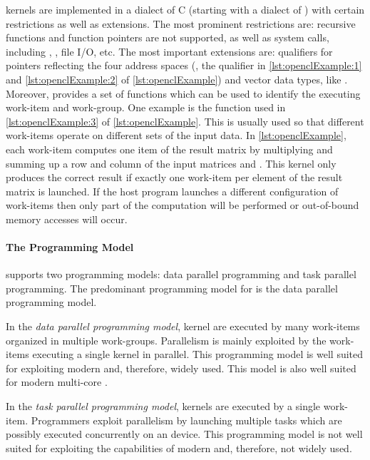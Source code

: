 \OpenCL kernels are implemented in a dialect of C (starting with  a dialect of \Cpp) with certain restrictions as well as extensions.
The most prominent restrictions are:
recursive functions and function pointers are not supported, as well as system calls, including , , file I/O, etc.
The most important extensions are:
qualifiers for pointers reflecting the four address spaces (\eg, the  qualifier in \autoref{lst:openclExample:1} and \autoref{lst:openclExample:2} of \autoref{lst:openclExample}) and vector data types, like .
Moreover, \OpenCL provides a set of functions which can be used to identify the executing work-item and work-group.
One example is the  function used in \autoref{lst:openclExample:3} of \autoref{lst:openclExample}.
This is usually used so that different work-items operate on different sets of the input data.
In \autoref{lst:openclExample}, each work-item computes one item of the result matrix  by multiplying and summing up a row and column of the input matrices  and .
This kernel only produces the correct result if exactly one work-item per element of the result matrix is launched.
If the host program launches a different configuration of work-items then only part of the computation will be performed or out-of-bound memory accesses will occur.

\paragraph{The \OpenCL Programming Model}

\OpenCL supports two programming models: data parallel programming and task parallel programming.
The predominant programming model for \OpenCL is the data parallel programming model.

In the \emph{data parallel programming model}, kernel are executed by many work-items organized in multiple work-groups.
Parallelism is mainly exploited by the work-items executing a single kernel in parallel.
This programming model is well suited for exploiting modern \GPUs and, therefore, widely used.
This model is also well suited for modern multi-core \CPUs.

In the \emph{task parallel programming model}, kernels are executed by a single work-item.
Programmers exploit parallelism by launching multiple tasks which are possibly executed concurrently on an \OpenCL device.
This programming model is not well suited for exploiting the capabilities of modern \GPUs and, therefore, not widely used.

